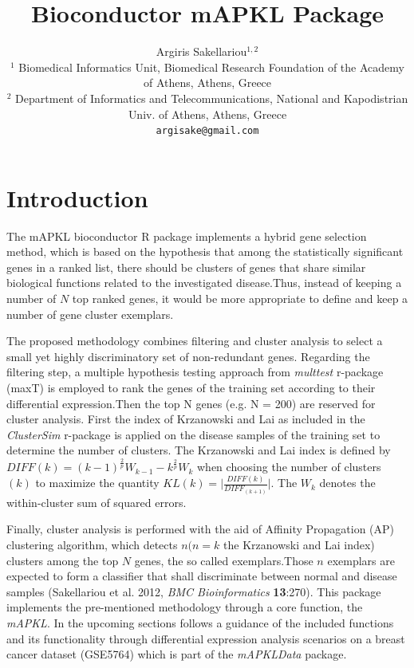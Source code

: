 \documentclass[12pt]{article}\usepackage[]{graphicx}\usepackage[usenames,dvipsnames]{color}
\begin{document}
\title{Bioconductor mAPKL Package}
\author{Argiris Sakellariou$^{1,2}$\\[1cm]
\small{$^1$ Biomedical Informatics Unit, Biomedical Research Foundation of the 
Academy of Athens, Athens, Greece}\\[0cm]
\small{$^2$ Department of Informatics and Telecommunications, National and 
Kapodistrian Univ. of Athens, Athens, Greece}\\[0cm]
\texttt{\small{argisake@gmail.com}}
}

\maketitle
{}

\renewcommand{\baselinestretch}{1.2}
\tableofcontents

\setcounter{page}{1}

\section{Introduction}
\noindent The mAPKL bioconductor R package implements a hybrid gene selection 
method, which is based on the hypothesis that among the statistically 
significant genes in a ranked list, there should be clusters of genes that share
similar biological functions related to the investigated disease.Thus, instead 
of keeping a number of $N$ top ranked genes, it would be more appropriate to 
define and keep a number of gene cluster exemplars. 

\noindent The proposed methodology combines filtering and cluster analysis to 
select a small  yet highly discriminatory set of non-redundant genes. Regarding 
the filtering step, a multiple hypothesis testing approach from \emph{multtest} 
r-package (maxT) is employed to rank the genes of the training set according to 
their differential expression.Then the top N genes (e.g. N = 200) are reserved 
for cluster analysis. First the index of Krzanowski and Lai as included in the 
\emph{ClusterSim} r-package is applied on the disease samples of the training 
set to determine the number of clusters. The Krzanowski and Lai index is defined 
by $DIFF(k)=(k-1)^\frac{2}{p}W_{k-1}-k^\frac{2}{p}W_{k}$ when choosing the 
number of clusters $(k)$ to maximize the 
quantity $KL(k)=\Big|\frac{DIFF(k)}{DIFF_(k+1)}\Big|$.
The $W_k$ denotes the within-cluster sum of squared errors. 

\noindent Finally, cluster analysis is performed with the aid of Affinity 
Propagation (AP) clustering algorithm, which detects $n (n=k$ the Krzanowski 
and Lai index) clusters among the top $N$ genes, the so called exemplars.Those 
$n$ exemplars are expected to form a classifier that shall discriminate between 
normal and disease samples (Sakellariou et al. 2012, \emph{BMC Bioinformatics} 
\textbf{13}:270).
\noindent This package implements the pre-mentioned methodology through a core 
function, the \emph{mAPKL}. In the upcoming sections follows a guidance of the 
included functions and its functionality through differential expression 
analysis scenarios on a breast cancer dataset (GSE5764) which is part of the 
\emph{mAPKLData} package.
\end{document}
